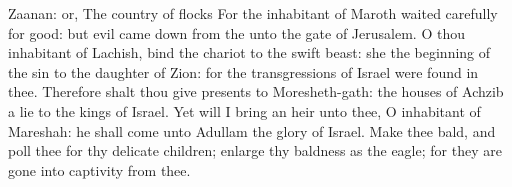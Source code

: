 {{Zaanan: or, The country of flocks}
For the
inhabitant of
Maroth waited
carefully for
good: but
evil came
down from the
{} unto the
gate of
Jerusalem.
O thou
inhabitant of
Lachish,
bind the
chariot to the swift
beast: she
{} the
beginning of the
sin to the
daughter of
Zion: for the
transgressions of
Israel were
found in thee.
Therefore shalt thou
give
presents to
Moresheth-gath: the
houses of
Achzib
{} a
lie to the
kings of
Israel.
Yet will I
bring an
heir unto thee, O
inhabitant of
Mareshah: he shall
come unto
Adullam the
glory of
Israel.
Make thee
bald, and
poll thee for thy
delicate
children;
enlarge thy
baldness as the
eagle; for they are gone into
captivity from thee.

}
